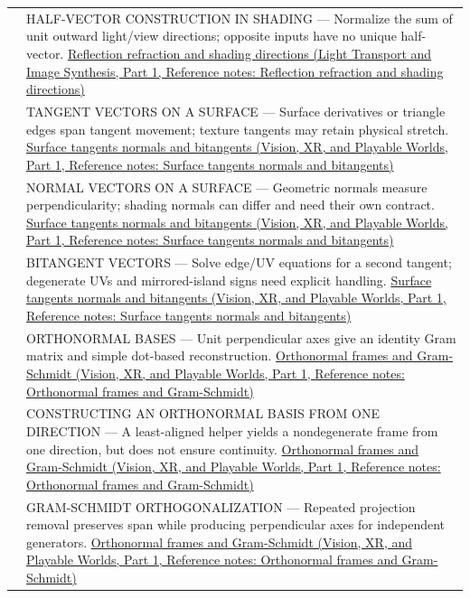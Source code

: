 {\begin{longtable}[]{@{}
  >{\raggedright\arraybackslash}p{}
  >{\raggedright\arraybackslash}p{}@{}}
555 & HALF-VECTOR CONSTRUCTION IN SHADING --- Normalize the sum of unit outward light/view directions; opposite inputs have no unique half-vector. \href{../04-Light-Transport-and-Image-Synthesis-P01/main.pdf\#nameddest=appendix-44e00863b4d5}{Reflection refraction and shading directions (Light Transport and Image Synthesis, Part 1, Reference notes: Reflection refraction and shading directions)} \\
556 & TANGENT VECTORS ON A SURFACE --- Surface derivatives or triangle edges span tangent movement; texture tangents may retain physical stretch. \href{../07-Vision-XR-and-Playable-Worlds-P01/main.pdf\#nameddest=appendix-e31893dec985}{Surface tangents normals and bitangents (Vision, XR, and Playable Worlds, Part 1, Reference notes: Surface tangents normals and bitangents)} \\
557 & NORMAL VECTORS ON A SURFACE --- Geometric normals measure perpendicularity; shading normals can differ and need their own contract. \href{../07-Vision-XR-and-Playable-Worlds-P01/main.pdf\#nameddest=appendix-e31893dec985}{Surface tangents normals and bitangents (Vision, XR, and Playable Worlds, Part 1, Reference notes: Surface tangents normals and bitangents)} \\
558 & BITANGENT VECTORS --- Solve edge/UV equations for a second tangent; degenerate UVs and mirrored-island signs need explicit handling. \href{../07-Vision-XR-and-Playable-Worlds-P01/main.pdf\#nameddest=appendix-e31893dec985}{Surface tangents normals and bitangents (Vision, XR, and Playable Worlds, Part 1, Reference notes: Surface tangents normals and bitangents)} \\
559 & ORTHONORMAL BASES --- Unit perpendicular axes give an identity Gram matrix and simple dot-based reconstruction. \href{../07-Vision-XR-and-Playable-Worlds-P01/main.pdf\#nameddest=appendix-c39f1ed34271}{Orthonormal frames and Gram-Schmidt (Vision, XR, and Playable Worlds, Part 1, Reference notes: Orthonormal frames and Gram-Schmidt)} \\
560 & CONSTRUCTING AN ORTHONORMAL BASIS FROM ONE DIRECTION --- A least-aligned helper yields a nondegenerate frame from one direction, but does not ensure continuity. \href{../07-Vision-XR-and-Playable-Worlds-P01/main.pdf\#nameddest=appendix-c39f1ed34271}{Orthonormal frames and Gram-Schmidt (Vision, XR, and Playable Worlds, Part 1, Reference notes: Orthonormal frames and Gram-Schmidt)} \\
561 & GRAM-SCHMIDT ORTHOGONALIZATION --- Repeated projection removal preserves span while producing perpendicular axes for independent generators. \href{../07-Vision-XR-and-Playable-Worlds-P01/main.pdf\#nameddest=appendix-c39f1ed34271}{Orthonormal frames and Gram-Schmidt (Vision, XR, and Playable Worlds, Part 1, Reference notes: Orthonormal frames and Gram-Schmidt)} \\

\end{longtable}}
